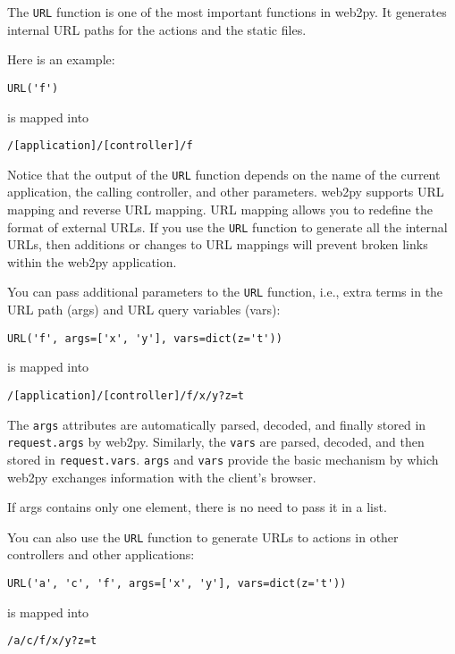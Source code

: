 \documentclass[justified,sixbynine,notoc]{tufte-book}
\def\ft{\small\tt}
\def\inxx#1{\index{#1}}
\begin{document}
\begin{fullwidth}
\inxx{URL}
The {\ft URL} function is one of the most important functions in web2py. It generates internal URL paths for the actions and the static files.

Here is an example:

\begin{lstlisting}
URL('f')
\end{lstlisting}
\noindent is mapped into

\begin{lstlisting}
/[application]/[controller]/f
\end{lstlisting}

Notice that the output of the {\ft URL} function depends on the name of the current application, the calling controller, and other parameters. web2py supports URL mapping and reverse URL mapping. URL mapping allows you to redefine the format of external URLs. If you use the {\ft URL} function to generate all the internal URLs, then additions or changes to URL mappings will prevent broken links within the web2py application.

You can pass additional parameters to the {\ft URL} function, i.e., extra terms in the URL path (args) and URL query variables (vars):

\begin{lstlisting}
URL('f', args=['x', 'y'], vars=dict(z='t'))
\end{lstlisting}
\noindent is mapped into

\begin{lstlisting}
/[application]/[controller]/f/x/y?z=t
\end{lstlisting}

The {\ft args} attributes are automatically parsed, decoded, and finally stored in {\ft request.args} by web2py. Similarly, the {\ft vars} are parsed, decoded, and then stored in {\ft request.vars}.
{\ft args} and {\ft vars} provide the basic mechanism by which web2py exchanges information with the client's browser.

If args contains only one element, there is no need to pass it in a list.

You can also use the {\ft URL} function to generate URLs to actions in other controllers and other applications:

\begin{lstlisting}
URL('a', 'c', 'f', args=['x', 'y'], vars=dict(z='t'))
\end{lstlisting}
\noindent is mapped into

\begin{lstlisting}
/a/c/f/x/y?z=t
\end{lstlisting}


\end{fullwidth}
\end{document}
